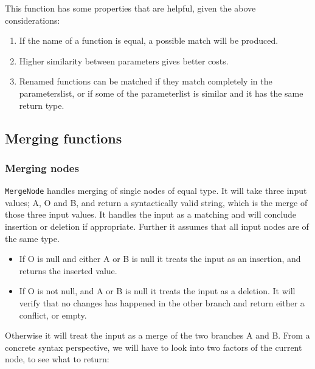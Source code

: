 \documentclass[11pt]{article}
\begin{document}
This function has some properties that are helpful, given the above considerations:

\begin{enumerate}
\item If the name of a function is equal, a possible match will be produced.
\item Higher similarity between parameters gives better costs.
\item Renamed functions can be matched if they match completely in the parameterslist, or if some of the parameterlist is similar and it has the same return type.
\end{enumerate}


\subsection{Merging functions}

\subsubsection{Merging nodes}
\texttt{MergeNode} handles merging of single nodes of equal type. It will take three input values; A, O and B, and return a syntactically valid string, which is the merge of those three input values. It handles the input as a matching and will conclude insertion or deletion if appropriate. Further it assumes that all input nodes are of the same type.

\begin{itemize}
   \item If O is null and either A or B is null it treats the input as an insertion, and returns the inserted value.
   \item If O is not null, and A or B is null it treats the input as a deletion. It will verify that no changes has happened in the other branch and return either a conflict, or empty.
\end{itemize}

Otherwise it will treat the input as a merge of the two branches A and B. From a concrete syntax perspective, we will have to look into two factors of the current node, to see what to return:
\end{document}
